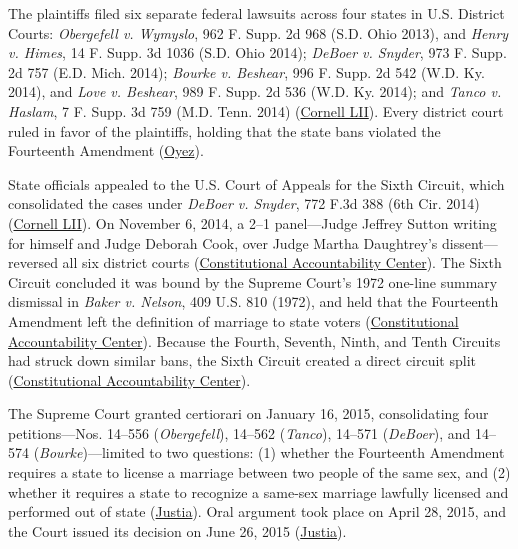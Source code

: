 \documentclass[12pt]{article}
\begin{document}
The plaintiffs filed six separate federal lawsuits across four states in U.S. District Courts: \textit{Obergefell v. Wymyslo}, 962 F. Supp. 2d 968 (S.D. Ohio 2013), and \textit{Henry v. Himes}, 14 F. Supp. 3d 1036 (S.D. Ohio 2014); \textit{DeBoer v. Snyder}, 973 F. Supp. 2d 757 (E.D. Mich. 2014); \textit{Bourke v. Beshear}, 996 F. Supp. 2d 542 (W.D. Ky. 2014), and \textit{Love v. Beshear}, 989 F. Supp. 2d 536 (W.D. Ky. 2014); and \textit{Tanco v. Haslam}, 7 F. Supp. 3d 759 (M.D. Tenn. 2014) (\href{https://www.law.cornell.edu/supremecourt/text/14-556}{Cornell LII}). Every district court ruled in favor of the plaintiffs, holding that the state bans violated the Fourteenth Amendment (\href{https://www.oyez.org/cases/2014/14-556}{Oyez}).

State officials appealed to the U.S. Court of Appeals for the Sixth Circuit, which consolidated the cases under \textit{DeBoer v. Snyder}, 772 F.3d 388 (6th Cir. 2014) (\href{https://www.law.cornell.edu/supremecourt/text/14-556}{Cornell LII}). On November 6, 2014, a 2--1 panel---Judge Jeffrey Sutton writing for himself and Judge Deborah Cook, over Judge Martha Daughtrey's dissent---reversed all six district courts (\href{https://www.theusconstitution.org/litigation/de-boer-v-snyder-6th-cir/}{Constitutional Accountability Center}). The Sixth Circuit concluded it was bound by the Supreme Court's 1972 one-line summary dismissal in \textit{Baker v. Nelson}, 409 U.S. 810 (1972), and held that the Fourteenth Amendment left the definition of marriage to state voters (\href{https://www.theusconstitution.org/litigation/de-boer-v-snyder-6th-cir/}{Constitutional Accountability Center}). Because the Fourth, Seventh, Ninth, and Tenth Circuits had struck down similar bans, the Sixth Circuit created a direct circuit split (\href{https://www.theusconstitution.org/litigation/de-boer-v-snyder-6th-cir/}{Constitutional Accountability Center}).

The Supreme Court granted certiorari on January 16, 2015, consolidating four petitions---Nos. 14--556 (\textit{Obergefell}), 14--562 (\textit{Tanco}), 14--571 (\textit{DeBoer}), and 14--574 (\textit{Bourke})---limited to two questions: (1) whether the Fourteenth Amendment requires a state to license a marriage between two people of the same sex, and (2) whether it requires a state to recognize a same-sex marriage lawfully licensed and performed out of state (\href{https://supreme.justia.com/cases/federal/us/576/644/}{Justia}). Oral argument took place on April 28, 2015, and the Court issued its decision on June 26, 2015 (\href{https://supreme.justia.com/cases/federal/us/576/644/}{Justia}).
\end{document}
